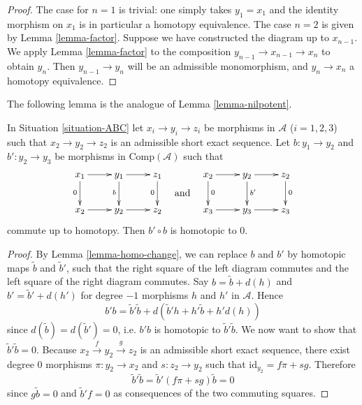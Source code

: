 \begin{proof}
The case for $n=1$ is trivial: one simply takes $y_1 = x_1$ and the
identity morphism on $x_1$ is in particular a homotopy equivalence.
The case $n = 2$ is given by Lemma \ref{lemma-factor}. Suppose we have
constructed the diagram up to $x_{n - 1}$. We apply
Lemma \ref{lemma-factor} to the composition
$y_{n - 1} \to x_{n-1} \to x_n$ to obtain $y_n$. Then
$y_{n - 1} \to y_n$ will be an admissible monomorphism, and
$y_n \to x_n$ a homotopy equivalence.
\end{proof}

\noindent
The following lemma is the analogue of Lemma \ref{lemma-nilpotent}.

\begin{lemma}
\label{lemma-triseq}
In Situation \ref{situation-ABC} let $x_i \to y_i \to z_i$
be morphisms in $\mathcal{A}$ ($i=1,2,3$) such that
$x_2 \to y_2\to z_2$ is an admissible short exact sequence.
Let $b : y_1 \to y_2$ and $b' : y_2\to y_3$ be morphisms
in $\text{Comp}(\mathcal{A})$ such that
$$
\vcenter{
\xymatrix{
x_1 \ar[d]_0 \ar[r] &
y_1 \ar[r] \ar[d]_b &
z_1 \ar[d]_0 \\
x_2 \ar[r] & y_2 \ar[r] & z_2
}
}
\quad\text{and}\quad
\vcenter{
\xymatrix{
x_2 \ar[d]^0 \ar[r] &
y_2 \ar[r] \ar[d]^{b'} &
z_2 \ar[d]^0 \\
x_3 \ar[r] & y_3 \ar[r] & z_3
}
}
$$
commute up to homotopy. Then $b'\circ b$ is homotopic to $0$.
\end{lemma}

\begin{proof}
By Lemma \ref{lemma-homo-change}, we can replace $b$ and $b'$
by homotopic maps $\tilde{b}$ and $\tilde{b}'$, such that the right
square of the left diagram commutes and the left square of the right
diagram commutes. Say $b = \tilde{b} + d(h)$ and $b'=\tilde{b}'+d(h')$
for degree $-1$ morphisms $h$ and $h'$ in $\mathcal{A}$. Hence
$$
b'b = \tilde{b}'\tilde{b} + d(\tilde{b}'h + h'\tilde{b} + h'd(h))
$$
since $d(\tilde{b})=d(\tilde{b}')=0$, i.e. $b'b$ is homotopic to
$\tilde{b}'\tilde{b}$. We now want to show that $\tilde{b}'\tilde{b}=0$.
Because $x_2\xrightarrow{f} y_2\xrightarrow{g} z_2$ is an admissible
short exact sequence, there exist degree $0$ morphisms
$\pi : y_2 \to x_2$ and $s : z_2 \to y_2$ such that
$\text{id}_{y_2} = f\pi + sg$. Therefore
$$
\tilde{b}'\tilde{b} = \tilde{b}'(f\pi + sg)\tilde{b} = 0
$$
since $g\tilde{b} = 0$ and $\tilde{b}'f = 0$ as consequences
of the two commuting squares.
\end{proof}

